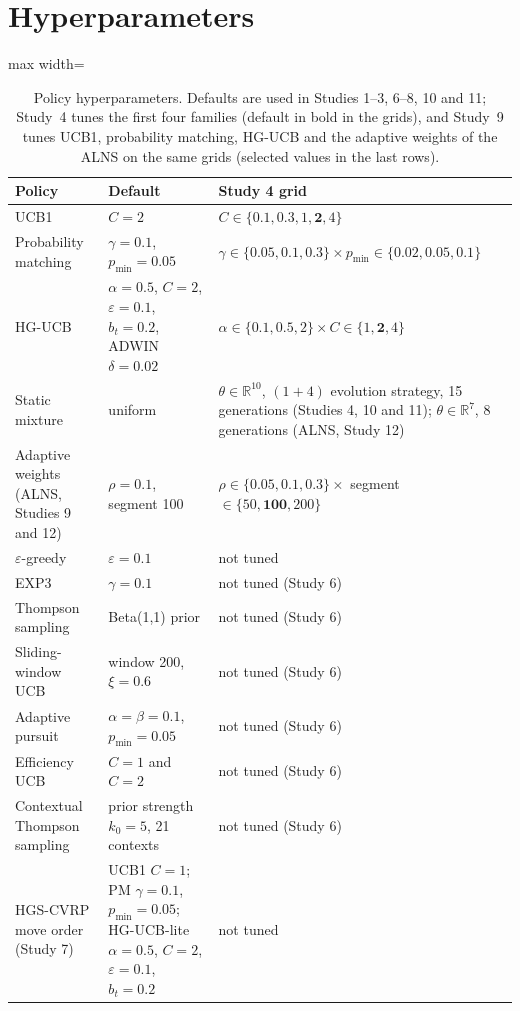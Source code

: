 \section{Hyperparameters}\label{app:hyper}
\begin{table}[h]
\caption{Policy hyperparameters. Defaults are used in Studies 1--3, 6--8, 10 and 11; Study~4 tunes the first four families (default in bold in the grids), and Study~9 tunes UCB1, probability matching, HG-UCB and the adaptive weights of the ALNS on the same grids (selected values in the last rows).}\label{tab:hyper}
\centering\small
\begin{adjustbox}{max width=\linewidth}
\begin{tabular}{lll}
\toprule
Policy & Default & Study 4 grid \\
\midrule
UCB1 & $C=2$ & $C\in\{0.1,0.3,1,\mathbf{2},4\}$ \\
Probability matching & $\gamma=0.1$, $p_{\min}=0.05$ & $\gamma\in\{0.05,\mathbf{0.1},0.3\}\times p_{\min}\in\{0.02,\mathbf{0.05},0.1\}$ \\
HG-UCB & $\alpha=0.5$, $C=2$, $\varepsilon=0.1$, $b_t=0.2$, ADWIN $\delta=0.02$ & $\alpha\in\{0.1,\mathbf{0.5},2\}\times C\in\{1,\mathbf{2},4\}$ \\
Static mixture & uniform & $\theta\in\mathbb{R}^{10}$, $(1{+}4)$ evolution strategy, 15 generations (Studies 4, 10 and 11); $\theta\in\mathbb{R}^{7}$, 8 generations (ALNS, Study 12) \\
Adaptive weights (ALNS, Studies 9 and 12) & $\rho=0.1$, segment 100 & $\rho\in\{0.05,\mathbf{0.1},0.3\}\times$ segment $\in\{50,\mathbf{100},200\}$ \\
$\varepsilon$-greedy & $\varepsilon=0.1$ & not tuned \\
EXP3 & $\gamma=0.1$ & not tuned (Study 6) \\
Thompson sampling & Beta(1,1) prior & not tuned (Study 6) \\
Sliding-window UCB & window 200, $\xi=0.6$ & not tuned (Study 6) \\
Adaptive pursuit & $\alpha=\beta=0.1$, $p_{\min}=0.05$ & not tuned (Study 6) \\
Efficiency UCB & $C=1$ and $C=2$ & not tuned (Study 6) \\
Contextual Thompson sampling & prior strength $k_0=5$, 21 contexts & not tuned (Study 6) \\
HGS-CVRP move order (Study 7) & UCB1 $C=1$; PM $\gamma=0.1$, $p_{\min}=0.05$; HG-UCB-lite $\alpha=0.5$, $C=2$, $\varepsilon=0.1$, $b_t=0.2$ & not tuned \\

\end{tabular}
\end{adjustbox}
\end{table}
